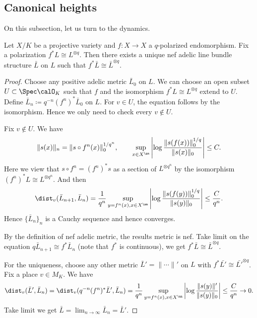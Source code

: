 \subsection[status=draft,tag=0000000,label=\labelNFM{subsec:canonical-height}]{Canonical heights}

On this subsection, let us turn to the dynamics.

\begin{lemma}[label=\labelNFM{lem:existence-of-canonical-adelic-line-bundle}, status=draft, tag=0000000]
	Let $X/K$ be a projective variety and $f: X \to X$ a $q$-polarized endomorphism.
	Fix a polarization $f^*L \cong L^{\otimes q}$.
	Then there exists a unique nef adelic line bundle structure $\bar{L}$ on $L$ such that $f^*\bar{L} \cong \bar{L}^{\otimes q}$.
\end{lemma}
\begin{proof}
	Choose any positive adelic metric $\bar L_0$ on $L$.
	We can choose an open subset $U \subset \Spec \calO_K$ such that $f$ and the isomorphism $f^*L \cong L^{\otimes q}$ extend to $U$.
	Define $\bar L_n \coloneqq q^{-n}(f^n)^*\bar L_0$ on $L$.
	For $v \in U$, the equation follows by the isomorphism.
	Hence we only need to check every $v \notin U$.

	Fix $v \notin U$.
	We have
	\[ \|s(x)\|_n = \|s\circ f^n(x)\|_0^{1/q^n}, \qquad \sup_{x\in X^\an} \left| \log \frac{\|s(f(x))\|_0^{1/q}}{\|s(x)\|_0} \right| \leq C. \]
	Here we view that $s\circ f^n = (f^n)^*s$ as a section of $L^{\otimes q^n}$ by the isomorphism $(f^n)^*L \cong L^{\otimes q^n}$.
	And then
	\[ \dist_v(\bar L_{n+1},\bar L_n) = \frac{1}{q^n} \sup_{y=f^n(x),x\in X^\an} \left| \log \frac{\|s(f(y))\|_0^{1/q}}{\|s(y)\|_0} \right| \leq \frac{C}{q^n}. \]
	Hence $\{\bar L_{n}\}_n$ is a Cauchy sequence and hence converges.

	By the definition of nef adelic metric, the results metric is nef.
	Take limit on the equation $q \bar L_{n+1} \cong f^* \bar L_n$ (note that $f^*$ is continuous), we get $f^*\bar{L} \cong \bar{L}^{\otimes q}$.

	For the uniqueness, choose any other metric $\bar L' = \|\cdots\|'$ on $L$ with $f^*\bar{L'} \cong \bar{L'}^{\otimes q}$.
	Fix a place $v \in M_K$.
	We have
	\[ \dist_v(\bar L',\bar L_n) = \dist_v(q^{-n}(f^n)^*\bar L',\bar L_n) = \frac{1}{q^n} \sup_{y=f^n(x),x\in X^\an} \left| \log \frac{\|s(y)\|'}{\|s(y)\|_0} \right| \leq \frac{C}{q^n} \to 0. \]
	Take limit we get $\bar L = \lim_{n \to \infty} \bar L_n = \bar L'$.
\end{proof}

